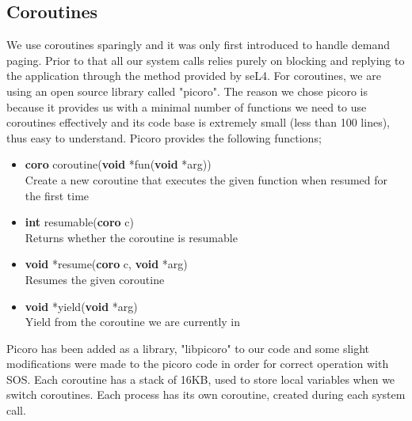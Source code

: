 \documentclass[12pt]{article}
\begin{document}
\subsection{Coroutines}
We use coroutines sparingly and it was only first introduced to handle demand paging. Prior to that all our system calls relies purely on blocking and replying to the application through the method provided by seL4.
For coroutines, we are using an open source library called "picoro". The reason we chose picoro is because it provides us with a minimal number of functions we need to use coroutines effectively and its code base is extremely small (less than 100 lines), thus easy to understand. Picoro provides the following functions;
\begin{itemize}
\item \textbf{coro} coroutine(\textbf{void} *fun(\textbf{void} *arg))\\
Create a new coroutine that executes the given function when resumed for the first time
\item \textbf{int} resumable(\textbf{coro} c)\\
Returns whether the coroutine is resumable
\item \textbf{void} *resume(\textbf{coro} c, \textbf{void} *arg)\\
Resumes the given coroutine
\item \textbf{void} *yield(\textbf{void} *arg)\\
Yield from the coroutine we are currently in
\end{itemize}

Picoro has been added as a library, "libpicoro" to our code and some slight modifications were made to the picoro code in order for correct operation with SOS.
Each coroutine has a stack of 16KB, used to store local variables when we switch coroutines.
Each process has its own coroutine, created during each system call.
\clearpage
\end{document}
